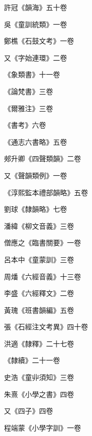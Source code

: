 \begin{pinyinscope}
 許冠《韻海》五十卷



 吳《童訓統類》一卷



 鄭樵《石鼓文考》一卷



 又《字始連環》二卷



 《象類書》十一卷



 《論梵書》三卷



 《爾雅注》三卷



 《書考》六卷



 《通志六書略》五卷



 郟升卿《四聲類韻》二卷



 又《聲韻類例》一卷



 《淳熙監本禮部韻略》五卷



 劉球《隸韻略》七卷



 潘緯《柳文音義》三卷



 僧應之《臨書關要》一卷



 呂本中《童蒙訓》三卷



 周燔《六經音義》十三卷



 李盛《六經釋文》二卷



 黃瑰《班書韻編》五卷



 張《石經注文考異》四十卷



 洪適《隸釋》二十七卷



 《隸續》二十一卷



 史浩《童丱須知》三卷



 朱熹《小學之書》四卷



 又《四子》四卷



 程端蒙《小學字訓》一卷




\end{pinyinscope}
